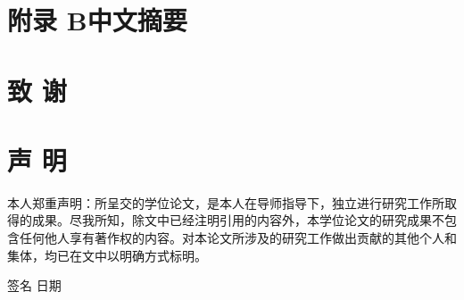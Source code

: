 \documentclass[twoside,12pt]{article}
\begin{document}
\section*{附录 B\quad 中文摘要}

\clearpage


\listoffigures
{}

\cleardoublepage


\printbibliography
{}
\cleardoublepage

\section*{致 \quad 谢}



\cleardoublepage

\section*{声 \quad 明}

\hspace*{2em}%
本人郑重声明：所呈交的学位论文，是本人在导师指导下，独立进行研究工作所取得的成果。尽我所知，除文中已经注明引用的内容外，本学位论文的研究成果不包含任何他人享有著作权的内容。对本论文所涉及的研究工作做出贡献的其他个人和集体，均已在文中以明确方式标明。

\bigskip
\hfill
签名 \underline{\hspace{6em}} \quad
日期 \underline{\hspace{6em}}

\cleardoublepage
\end{document}
